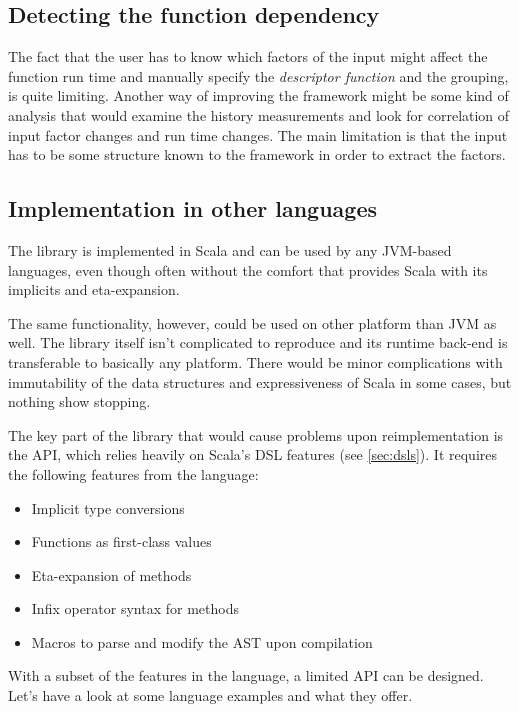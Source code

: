 \subsection{Detecting the function dependency}

The fact that the user has to know which factors of the input might affect the function run time and manually specify the \textit{descriptor function} and the grouping, is quite limiting. Another way of improving the framework might be some kind of analysis that would examine the history measurements and look for correlation of input factor changes and run time changes. The main limitation is that the input has to be some structure known to the framework in order to extract the factors.

\subsection{Implementation in other languages}

The library is implemented in Scala and can be used by any JVM-based languages, even though often without the comfort that provides Scala with its implicits and eta-expansion.

The same functionality, however, could be used on other platform than JVM as well. The library itself isn't complicated to reproduce and its runtime back-end is transferable to basically any platform. There would be minor complications with immutability of the data structures and expressiveness of Scala in some cases, but nothing show stopping.

The key part of the library that would cause problems upon reimplementation is the API, which relies heavily on Scala's DSL features (see \ref{sec:dsls}). It requires the following features from the language:

\begin{itemize}
	\item Implicit type conversions
	\item Functions as first-class values
	\item Eta-expansion of methods
	\item Infix operator syntax for methods
	\item Macros to parse and modify the AST upon compilation
\end{itemize}

With a subset of the features in the language, a limited API can be designed. Let's have a look at some language examples and what they offer.

